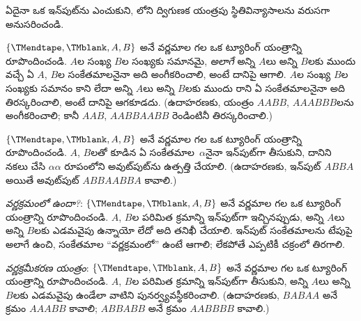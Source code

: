 \documentclass[../../../include/open-logic-section]{subfiles}
\begin{document}
\begin{prob}
ఏదైనా ఒక ఇన్‌పుట్‌ను ఎంచుకుని, లోని ద్విగుణక
యంత్రపు స్థితివిన్యాసాలను వరుసగా అనుసరించండి.
\end{prob}

\begin{prob}
$\{\TMendtape,\TMblank, A, B\}$ అనే వర్ణమాల గల ఒక ట్యూరింగ్ యంత్రాన్ని
రూపొందించండి. $A$ల సంఖ్య $B$ల సంఖ్యకు సమానమై, \emph{అలాగే} అన్ని $A$లు
అన్ని $B$లకు ముందు వచ్చే ఏ $A$, $B$ల సంకేతమాలనైనా అది అంగీకరించాలి, అంటే
దానిపై ఆగాలి. $A$ల సంఖ్య $B$ల సంఖ్యకు సమానం కాని లేదా అన్ని $A$లు అన్ని
$B$లకు ముందు రాని ఏ సంకేతమాలనైనా అది తిరస్కరించాలి, అంటే దానిపై ఆగకూడదు.
(ఉదాహరణకు, యంత్రం $AABB$, $AAABBB$లను అంగీకరించాలి; కానీ $AAB$,
$AABBAABB$ రెండింటినీ తిరస్కరించాలి.)
\end{prob}

\begin{prob}
$\{\TMendtape,\TMblank, A, B\}$ అనే వర్ణమాల గల ఒక ట్యూరింగ్ యంత్రాన్ని
రూపొందించండి. $A$, $B$లతో కూడిన ఏ సంకేతమాల~$\alpha$నైనా ఇన్‌పుట్‌గా తీసుకుని,
దానిని నకలు చేసి $\alpha\alpha$ రూపంలోని అవుట్‌పుట్‌ను ఉత్పత్తి చేయాలి.
(ఉదాహరణకు, ఇన్‌పుట్ $ABBA$ అయితే అవుట్‌పుట్ $ABBAABBA$ కావాలి.)
\end{prob}

\begin{prob}
\emph{వర్ణక్రమంలో ఉందా?}: $\{\TMendtape,\TMblank, A, B\}$ అనే వర్ణమాల గల
ఒక ట్యూరింగ్ యంత్రాన్ని రూపొందించండి. $A$, $B$ల పరిమిత క్రమాన్ని ఇన్‌పుట్‌గా
ఇచ్చినప్పుడు, అన్ని $A$లు అన్ని $B$లకు ఎడమవైపు ఉన్నాయో లేదో అది తనిఖీ చేయాలి.
ఇన్‌పుట్ సంకేతమాలను టేపుపై అలాగే ఉంచి, సంకేతమాల ``వర్ణక్రమంలో'' ఉంటే ఆగాలి;
లేకపోతే ఎప్పటికీ చక్రంలో తిరగాలి.
\end{prob}

\begin{prob}
\emph{వర్ణక్రమీకరణ యంత్రం}: $\{\TMendtape,\TMblank, A, B\}$ అనే వర్ణమాల గల
ఒక ట్యూరింగ్ యంత్రాన్ని రూపొందించండి. $A$, $B$ల పరిమిత క్రమాన్ని ఇన్‌పుట్‌గా
తీసుకుని, అన్ని $A$లు అన్ని $B$లకు ఎడమవైపు ఉండేలా వాటిని పునర్వ్యవస్థీకరించాలి.
(ఉదాహరణకు, $BABAA$ అనే క్రమం $AAABB$ కావాలి; $ABBABB$ అనే క్రమం $AABBBB$
కావాలి.)
\end{prob}
\end{document}
